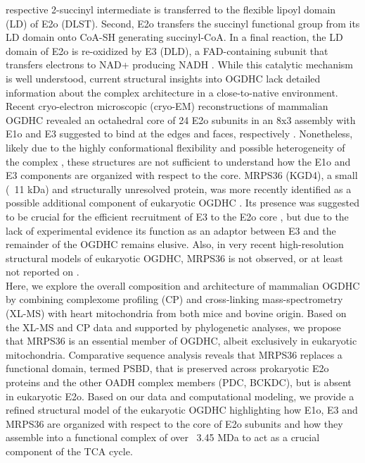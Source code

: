 \documentclass[times, twoside]{zHenriquesLab-StyleBioRxiv}
\begin{document}
respective 2-succinyl intermediate is transferred to the flexible lipoyl domain (LD) of E2o (DLST). Second, E2o transfers the succinyl functional group from its LD domain onto CoA-SH generating succinyl-CoA. In a final reaction, the LD domain of E2o is re-oxidized by E3 (DLD), a FAD-containing subunit that transfers electrons to NAD+ producing NADH \cite{Kyrilis_2021,Qi_2011}. While this catalytic mechanism is well understood, current structural insights into OGDHC lack detailed information about the complex architecture \cite{Frank_2007,Knapp_1998,Ricaud_1996,Robien_1992} in a close-to-native environment. Recent cryo-electron microscopic (cryo-EM) reconstructions of mammalian OGDHC revealed an octahedral core of 24 E2o subunits in an 8x3 assembly with E1o and E3 suggested to bind at the edges and faces, respectively \cite{Liu_2022,Nagy_2021}. Nonetheless, likely due to the highly conformational flexibility and possible heterogeneity of the complex \cite{Lengyel_2008}, these structures are not sufficient to understand how the E1o and E3 components are organized with respect to the core. MRPS36 (KGD4), a small (~11 kDa) and structurally unresolved protein, was more recently identified as a possible additional component of eukaryotic OGDHC \cite{Chatzispyrou_2018,Guerrero-Castillo_2021,Heublein_2014}. Its presence was suggested to be crucial for the efficient recruitment of E3 to the E2o core \cite{Heublein_2014}, but due to the lack of experimental evidence its function as an adaptor between E3 and the remainder of the OGDHC remains elusive. Also, in very recent high-resolution structural models of eukaryotic OGDHC, MRPS36 is not observed, or at least not reported on \cite{Liu_2022,Nagy_2021}.\\
Here, we explore the overall composition and architecture of mammalian OGDHC by combining complexome profiling (CP) \cite{Cabrera-Orefice_2021,Hevler_2021a} and cross-linking mass-spectrometry (XL-MS) with heart mitochondria from both mice and bovine origin. Based on the XL-MS and CP data and supported by phylogenetic analyses, we propose that MRPS36 is an essential member of OGDHC, albeit exclusively in eukaryotic mitochondria. Comparative sequence analysis reveals that MRPS36 replaces a functional domain, termed PSBD, that is preserved across prokaryotic E2o proteins and the other OADH complex members (PDC, BCKDC), but is absent in eukaryotic E2o. Based on our data and computational modeling, we provide a refined structural model of the eukaryotic OGDHC highlighting how E1o, E3 and MRPS36 are organized with respect to the core of E2o subunits and how they assemble into a functional complex of over ~3.45 MDa to act as a crucial component of the TCA cycle.
\end{document}
